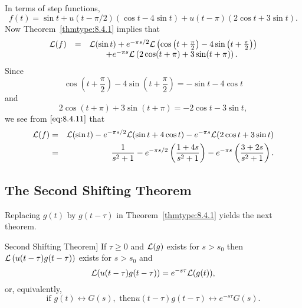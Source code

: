 \documentclass{ximera}
\begin{document}
\begin{example}
\begin{explanation}
In terms of step functions,
$$
f(t)=\sin t+u(t-\pi/2) (\cos t-4\sin t)+u(t-\pi) (2
\cos t+3\sin t).
$$
Now Theorem~\ref{thmtype:8.4.1} implies that
\begin{equation}\label{eq:8.4.11}
\begin{array}{ccl}
{\cal L}(f)&=&{\cal L}(\sin t)+e^{-\pi s/2}{\cal L}
\left(\cos\left(t+\frac{\pi}{2}\right)-4\sin\left(t+\frac{\pi}{2}\right)\right)\\
&&\qquad+e^{-\pi s}{\cal L}\left(2\cos(t+\pi)+3\sin(t+\pi)\right).
\end{array}
\end{equation}
Since
$$
\cos\left(t+\frac{\pi}{2}\right)-4\sin\left(t+\frac{\pi}{2}\right)=-\sin t-4\cos t
$$
and
$$
 2\cos (t+\pi)+3\sin (t+\pi)=-2\cos t-3\sin t,
$$
we see from $\eqref{eq:8.4.11}$ that
\begin{eqnarray*}
{\cal L}(f)&=&{\cal L}(\sin t)-e^{-\pi s/2}{\cal L}(\sin t+4\cos t)
-e^{-\pi s}{\cal L}(2\cos t+3\sin t)\\
&=&\frac{1}{s^2+1}-e^{-\pi s/2} \left(\frac{1+4s}{s^2+1}\right)
-e^{-\pi s}\left(\frac{3+2s}{s^2+1}\right).
\end{eqnarray*}
\end{explanation}
\end{example}




\subsection*{The Second Shifting Theorem}

Replacing $g(t)$ by $g(t-\tau)$ in Theorem~\ref{thmtype:8.4.1}
yields the next theorem.

\begin{theorem}Second Shifting
Theorem]\label{thmtype:8.4.2} If
 $\tau\geq 0$ and ${\cal L}(g)$ exists for $s>s_0$
then  ${\cal L}\left(u(t-\tau)g(t-\tau)\right)$ exists for $s>s_0$ and
$$
{\cal L}(u(t-\tau)g(t-\tau))=e^{-s\tau}{\cal L}(g(t)),
$$
or, equivalently,
\begin{equation}\label{eq:8.4.12}
\mbox{if } g(t)\leftrightarrow G(s),\mbox{ then
}u(t-\tau)g(t-\tau)\leftrightarrow e^{-s\tau}G(s).
\end{equation}
\end{theorem}
\end{document}
